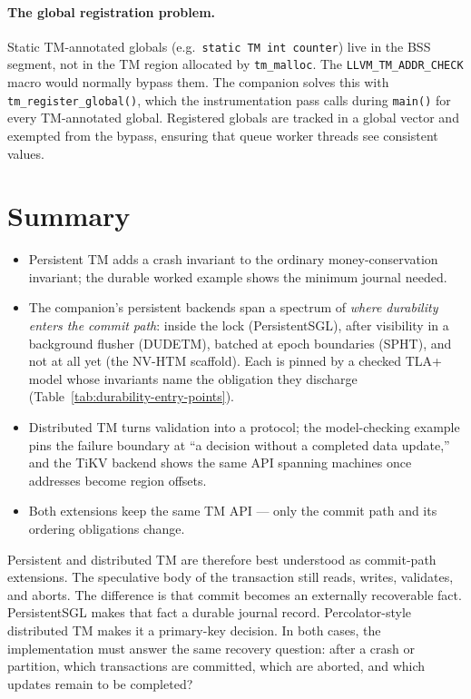 \paragraph{The global registration problem.}
Static TM-annotated globals (e.g.\ \texttt{static TM int counter}) live in
the BSS segment, not in the TM region allocated by \texttt{tm\_malloc}.
The \texttt{LLVM\_TM\_ADDR\_CHECK} macro would normally bypass them.  The
companion solves this with \texttt{tm\_register\_global()}, which the
instrumentation pass calls during \texttt{main()} for every TM-annotated
global.  Registered globals are tracked in a global vector and exempted from
the bypass, ensuring that queue worker threads see consistent values.

\section{Summary}
\begin{itemize}
    \item Persistent TM adds a crash invariant to the ordinary money-conservation invariant; the durable worked example shows the minimum journal needed.
    \item The companion's persistent backends span a spectrum of \emph{where durability enters the commit path}: inside the lock (PersistentSGL), after visibility in a background flusher (DUDETM), batched at epoch boundaries (SPHT), and not at all yet (the NV-HTM scaffold). Each is pinned by a checked TLA+ model whose invariants name the obligation they discharge (Table~\ref{tab:durability-entry-points}).
    \item Distributed TM turns validation into a protocol; the model-checking example pins the failure boundary at ``a decision without a completed data update,'' and the TiKV backend shows the same API spanning machines once addresses become region offsets.
    \item Both extensions keep the same TM API --- only the commit path and its ordering obligations change.
\end{itemize}

Persistent and distributed TM are therefore best understood as commit-path
extensions. The speculative body of the transaction still reads, writes,
validates, and aborts. The difference is that commit becomes an externally
recoverable fact. PersistentSGL makes that fact a durable journal record.
Percolator-style distributed TM makes it a primary-key decision. In both cases,
the implementation must answer the same recovery question: after a crash or
partition, which transactions are committed, which are aborted, and which
updates remain to be completed?

